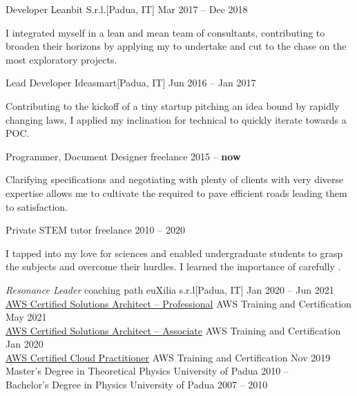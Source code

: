 \documentclass[9pt]{scrartcl}
\def\Phi{1.618}
\newlength{\Pad}\setlength{\Pad}{14.562pt} %
\begin{document}
\smallskip

\Event
  {Developer}
  {Leanbit S.r.l.}[Padua, IT]
  {Mar 2017 -- Dec 2018}

I integrated myself in a lean and mean team of consultants, contributing to
broaden their horizons by applying my  to undertake and cut
to the chase on the most exploratory projects.

\smallskip

\Event
  {Lead Developer}
  {Ideasmart}[Padua, IT]
  {Jun 2016 -- Jan 2017}

Contributing to the kickoff of a tiny startup pitching an idea bound by rapidly
changing laws, I applied my inclination for technical 
to quickly iterate towards a POC.

\smallskip

\Event
  {Programmer, Document Designer}
  {freelance}
  {2015 -- \textbf{now}}

Clarifying specifications and negotiating with plenty of clients with very
diverse expertise allows me to cultivate the  required to
pave efficient roads leading them to satisfaction.

\smallskip

\Event
  {Private STEM tutor}
  {freelance}
  {2010 -- 2020}

I tapped into my love for sciences and enabled undergraduate students to grasp
the subjects and overcome their hurdles. I learned the importance of carefully
.



\Event
  {\emph{Resonance Leader} coaching path}
  {euXilia s.r.l}[Padua, IT]
  {Jan 2020 -- Jun 2021}\\
\Event
  {\href{https://www.credly.com/badges/37aaaf27-3a2e-436d-9195-db4f46eb222e/public_url}
  {%
   AWS Certified Solutions Architect -- Professional}}
  {AWS Training and Certification}
  {May 2021}\\
\Event
  {\href{https://www.credly.com/badges/d092afab-f194-4074-ade6-78728c854faa/public_url}
  {%
   AWS Certified Solutions Architect -- Associate}}
  {AWS Training and Certification}
  {Jan 2020}\\
\Event
  {\href{https://www.credly.com/badges/d268e963-65ba-462b-a835-f65a7baccccd/public_url}
  {%
   AWS Certified Cloud Practitioner}}
  {AWS Training and Certification}
  {Nov 2019}\\
\Event
  {Master's Degree in Theoretical Physics}
  {University of Padua}
  {2010 -- }\\
\Event
  {Bachelor's Degree in Physics}
  {University of Padua}
  {2007 -- 2010}\\
\end{document}

